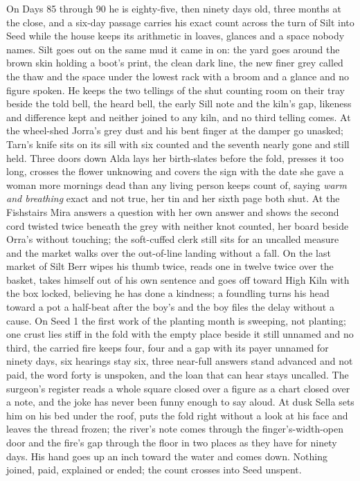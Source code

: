 \documentclass{design/chronicle}
\begin{document}
{On Days 85 through 90 he is eighty-five, then ninety days old, three months at the close, and a six-day passage carries his exact count across the turn of Silt into Seed while the house keeps its arithmetic in loaves, glances and a space nobody names. Silt goes out on the same mud it came in on: the yard goes around the brown skin holding a boot’s print, the clean dark line, the new finer grey called the thaw and the space under the lowest rack with a broom and a glance and no figure spoken. He keeps the two tellings of the shut counting room on their tray beside the told bell, the heard bell, the early Sill note and the kiln’s gap, likeness and difference kept and neither joined to any kiln, and no third telling comes. At the wheel-shed Jorra’s grey dust and his bent finger at the damper go unasked; Tarn’s knife sits on its sill with six counted and the seventh nearly gone and still held. Three doors down Alda lays her birth-slates before the fold, presses it too long, crosses the flower unknowing and covers the sign with the date she gave a woman more mornings dead than any living person keeps count of, saying \emph{warm and breathing} exact and not true, her tin and her sixth page both shut. At the Fishstairs Mira answers a question with her own answer and shows the second cord twisted twice beneath the grey with neither knot counted, her board beside Orra’s without touching; the soft-cuffed clerk still sits for an uncalled measure and the market walks over the out-of-line landing without a fall. On the last market of Silt Berr wipes his thumb twice, reads one in twelve twice over the basket, takes himself out of his own sentence and goes off toward High Kiln with the box locked, believing he has done a kindness; a foundling turns his head toward a pot a half-beat after the boy’s and the boy files the delay without a cause. On Seed 1 the first work of the planting month is sweeping, not planting; one crust lies stiff in the fold with the empty place beside it still unnamed and no third, the carried fire keeps four, four and a gap with its payer unnamed for ninety days, six hearings stay six, three near-full answers stand advanced and not paid, the word forty is unspoken, and the loan that can hear stays uncalled. The surgeon’s register reads a whole square closed over a figure as a chart closed over a note, and the joke has never been funny enough to say aloud. At dusk Sella sets him on his bed under the roof, puts the fold right without a look at his face and leaves the thread frozen; the river’s note comes through the finger’s-width-open door and the fire’s gap through the floor in two places as they have for ninety days. His hand goes up an inch toward the water and comes down. Nothing joined, paid, explained or ended; the count crosses into Seed unspent.

}
\end{document}

